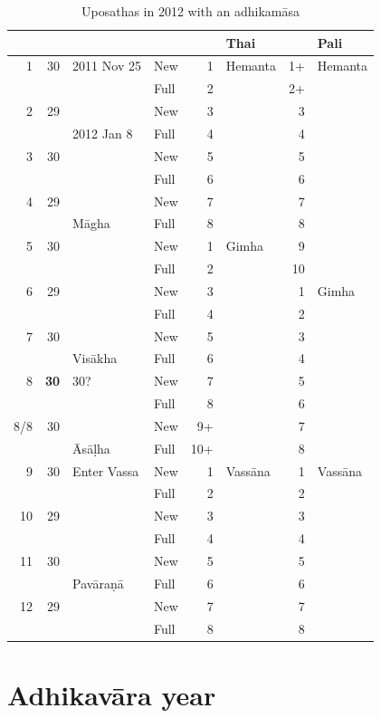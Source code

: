 \documentclass[11pt,oneside]{memoir-article}
\begin{document}
\begin{table}[p]
\caption{\label{tbl-uposathas-2012} Uposathas in 2012 with an adhikamāsa}
\centering
\begin{tabular}{rrll|rl|rl}
 &  &  &  &  & Thai &  & Pali\\
\hline
1 & 30 & 2011 Nov 25 & New & 1 & Hemanta & 1+ & Hemanta\\
 &  &  & Full & 2 &  & 2+ & \\
2 & 29 &  & New & 3 &  & 3 & \\
 &  & 2012 Jan 8 & Full & 4 &  & 4 & \\
3 & 30 &  & New & 5 &  & 5 & \\
 &  &  & Full & 6 &  & 6 & \\
4 & 29 &  & New & 7 &  & 7 & \\
 &  & Māgha & Full & 8 &  & 8 & \\
\hline
5 & 30 &  & New & 1 & Gimha & 9 & \\
 &  &  & Full & 2 &  & 10 & \\
6 & 29 &  & New & 3 &  & 1 & Gimha\\
 &  &  & Full & 4 &  & 2 & \\
7 & 30 &  & New & 5 &  & 3 & \\
 &  & Visākha & Full & 6 &  & 4 & \\
8 & \textbf{30} & 30? & New & 7 &  & 5 & \\
 &  &  & Full & 8 &  & 6 & \\
\hline
8/8 & 30 &  & New & 9+ &  & 7 & \\
 &  & Āsāḷha & Full & 10+ &  & 8 & \\
\hline
9 & 30 & Enter Vassa & New & 1 & Vassāna & 1 & Vassāna\\
 &  &  & Full & 2 &  & 2 & \\
10 & 29 &  & New & 3 &  & 3 & \\
 &  &  & Full & 4 &  & 4 & \\
11 & 30 &  & New & 5 &  & 5 & \\
 &  & Pavāraṇā & Full & 6 &  & 6 & \\
12 & 29 &  & New & 7 &  & 7 & \\
 &  &  & Full & 8 &  & 8 & \\
\end{tabular}
\end{table}

\section{Adhikavāra year}
\label{sec-1-4}
\end{document}
